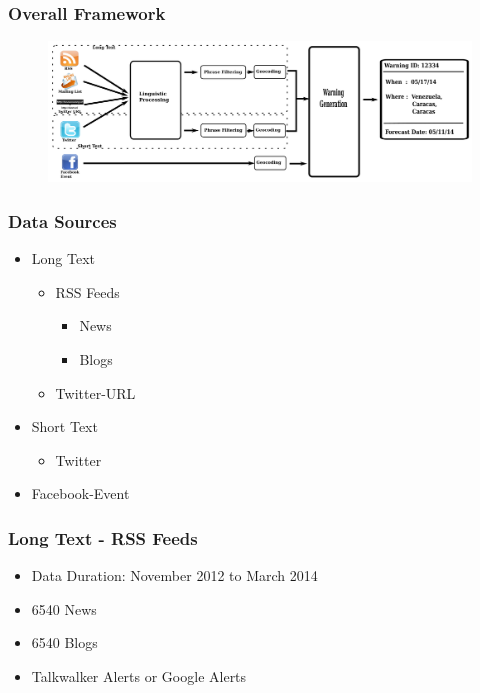 \documentclass{beamer}
\begin{document}
\begin{frame}
\frametitle{Overall Framework}
\begin{figure}
    \centering
    \includegraphics[height=0.6\textheight,width=\textwidth]{pipeline}
\end{figure}
\end{frame}

\begin{frame}
    \frametitle{Data Sources}
    \begin{itemize}
        \item
            Long Text
            \begin{itemize}
                \item
                    RSS Feeds
                    \begin{itemize}
                        \item
                            News
                        \item
                            Blogs
                    \end{itemize}
                \item
                    Twitter-URL
            \end{itemize}
        \item
            Short Text
                \begin{itemize}
                    \item
                        Twitter
                \end{itemize}
        \item
            Facebook-Event

    \end{itemize}
\end{frame}

\begin{frame}
    \frametitle{Long Text - RSS Feeds}
    \begin{itemize}
        \item
            Data Duration: November 2012 to March 2014
        \item
            6540 News
        \item
            6540 Blogs
        \item
            Talkwalker Alerts or Google Alerts
    \end{itemize}
\end{frame}
\end{document}
